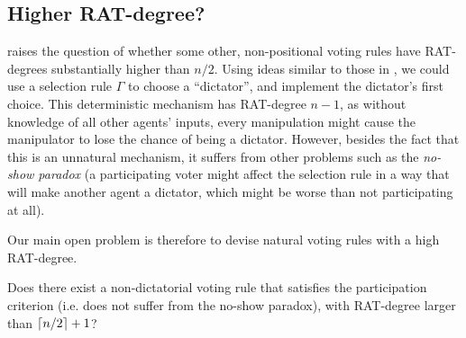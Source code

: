 \fi


\iffalse
\subsection{Condorcet rules}
\erel{Just some initial thoughts}
A \emph{Condorcet voting rule} is a rule that always selects a Condorcet winner if one exists. Condorcet rules differ in how they pick the winner when a Condorcet winner does not exist.

A simple Condorcet rule is the MaxMin-Condorcet rule. It works in the following way:
\begin{itemize}
\item For each ordered pair of candidates $(c,c')$, compute $S(c,c')$ as the number of voters who prefer $c$ to $c'$.
\item The score of each candidate $c$ is $\min_{c'} S(c,c')$, that is, the lowest score of $c$ in all pairwise competitions.
\item The candidate with the highest score wins. 
\end{itemize}
Note that, if there is a Condorcet winner, then his score will be larger than $n/2$, and the score of all other candidates will be smaller than $n/2$, so the Condorcet winner will be selected.

This rule potentially has a high RAT-degree, as the winner depends on $m-1$ scores per agent, rather than one. 
\erel{I could not compute its RAT-degree - some brain-storming on this could help.}
\fi


\subsection{Higher RAT-degree?}
 raises the question of whether some other, non-positional voting rules have RAT-degrees substantially higher than $n/2$.
%
Using ideas similar to those in , 
we could use a selection rule $\Gamma$ to choose a ``dictator'', and implement the dictator's first choice.
This deterministic mechanism has RAT-degree $n-1$, as without knowledge of all other agents' inputs, every manipulation might cause the manipulator to lose the chance of being a dictator. 
However, besides the fact that this is an unnatural mechanism, it suffers from other problems such as the \emph{no-show paradox} (a participating voter might affect the selection rule in a way that will make another agent a dictator, which might be worse than not participating at all).

Our main open problem is therefore to devise natural voting rules with a high RAT-degree.
\begin{open}
Does there exist a non-dictatorial voting rule that satisfies the participation criterion (i.e. does not suffer from the no-show paradox),  with RAT-degree larger than $\left\lceil n/2 \right\rceil+1$? 
\end{open}

